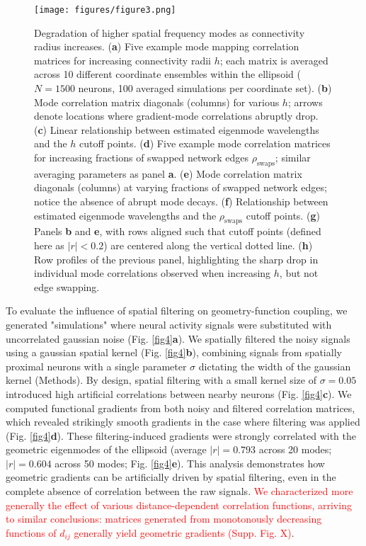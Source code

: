 \documentclass{article}
\begin{document}
\begin{figure}[t]
    \centering
    \texttt{[image: figures/figure3.png]}
    \caption{Degradation of higher spatial frequency modes as connectivity radius increases. (\textbf{a}) Five example mode mapping correlation matrices for increasing connectivity radii $h$; each matrix is averaged across 10 different coordinate ensembles within the ellipsoid ($N=1500$ neurons, 100 averaged simulations per coordinate set). (\textbf{b}) Mode correlation matrix diagonals (columns) for various $h$; arrows denote locations where gradient-mode correlations abruptly drop. (\textbf{c}) Linear relationship between estimated eigenmode wavelengths and the $h$ cutoff points. (\textbf{d}) Five example mode correlation matrices for increasing fractions of swapped network edges $\rho_{\text{swaps}}$; similar averaging parameters as panel \textbf{a}. (\textbf{e}) Mode correlation matrix diagonals (columns) at varying fractions of swapped network edges; notice the absence of abrupt mode decays. (\textbf{f}) Relationship between estimated eigenmode wavelengths and the $\rho_{\text{swaps}}$ cutoff points. (\textbf{g}) Panels \textbf{b} and \textbf{e}, with rows aligned such that cutoff points (defined here as $|r|<0.2$) are centered along the vertical dotted line. (\textbf{h}) Row profiles of the previous panel, highlighting the sharp drop in individual mode correlations observed when increasing $h$, but not edge swapping.}
    \label{fig3}
    \hrulefill
\end{figure}

To evaluate the influence of spatial filtering on geometry-function coupling, we generated "simulations" where neural activity signals were substituted with uncorrelated gaussian noise (Fig. \ref{fig4}\textbf{a}). We spatially filtered the noisy signals using a gaussian spatial kernel (Fig. \ref{fig4}\textbf{b}), combining signals from spatially proximal neurons with a single parameter $\sigma$ dictating the width of the gaussian kernel (Methods). By design, spatial filtering with a small kernel size of $\sigma=0.05$ introduced high artificial correlations between nearby neurons (Fig. \ref{fig4}\textbf{c}). We computed functional gradients from both noisy and filtered correlation matrices, which revealed strikingly smooth gradients in the case where filtering was applied (Fig. \ref{fig4}\textbf{d}). These filtering-induced gradients were strongly correlated with the geometric eigenmodes of the ellipsoid (average $|r|=0.793$ across 20 modes; $|r|=0.604$ across 50 modes; Fig. \ref{fig4}\textbf{e}). This analysis demonstrates how geometric gradients can be artificially driven by spatial filtering, even in the complete absence of correlation between the raw signals. \textcolor{red}{We characterized more generally the effect of various distance-dependent correlation functions, arriving to similar conclusions: matrices generated from monotonously decreasing functions of $d_{ij}$ generally yield geometric gradients (Supp. Fig. X)}.
\end{document}
